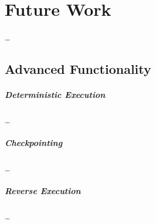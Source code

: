 
\chapter{Future Work}
\label{cha:futurework}
\ldots


\section{Advanced Functionality}
\label{sec:futurework_advancedfunctionality}

\paragraph{Deterministic Execution}
\label{par:futurework_advancedfunctionality_deterministicexecution}
\ldots

\paragraph{Checkpointing}
\label{par:futurework_advancedfunctionality_checkpointing}
\ldots

\paragraph{Reverse Execution}
\label{par:futurework_advancedfunctionality_reverseexecution}
\ldots